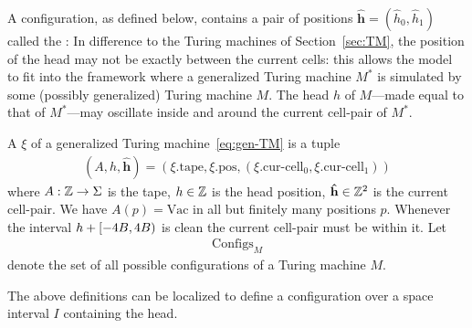 \documentclass[11pt]{memoir}
\theoremstyle{definition} %
\renewcommand{\vek}[1]{\mathbf{#1}}
\def\B{B}
\newcommand{\Configs}{\mathrm{Configs}}
\newcommand{\h}{h} %
\newcommand{\hc}{\hat h}
\newcommand{\vhc}{\vek{\hat h}}
\newcommand{\pos}{\mathrm{pos}}
\newcommand{\curcell}{\textrm{cur-cell}}
\newcommand{\tape}{\mathrm{tape}}
\newcommand{\Vacant}{\mathrm{Vac}}
\begin{document}
A configuration, as defined below, contains a pair of positions
\( \vhc = (\hc_{0},\hc_{1}) \) called the :
In difference to the Turing machines of Section~\ref{sec:TM},
the position of the head may not be exactly between the current cells: this allows the model
to fit into the framework where 
a generalized Turing machine \( M^{*} \) is simulated by some (possibly
generalized) Turing machine \( M \).
The head \( h \) of \( M \)---made equal to that of \( M^{*} \)---may
oscillate inside and around the current cell-pair of \( M^{*} \).

\begin{definition}[Configuration]\label{def:config}
    A  \( \xi \) of a generalized Turing machine~\eqref{eq:gen-TM} is a tuple
    \begin{align*}
      (A,\h,\vhc) = (\xi.\tape,\xi.\pos, (\xi.\curcell_{0},\xi.\curcell_{1}))
    \end{align*}
    where \( A:\mathbb{Z}\to\Sigma \) is the tape, \( \h \in\bbZ \) is the head position, \( \vhc\in\bbZ^{2} \)
    is the current cell-pair.
    We have \( A(p)=\Vacant \) in all but finitely many positions \( p \).
Whenever the interval \( \h+\lint{-4\B}{4\B} \) is clean the current cell-pair
must be within it.
Let
    \begin{align*}
         \Configs_{M}
    \end{align*}
    denote the set of all possible configurations of a Turing machine \( M \).
\end{definition}

The above definitions can be localized to define a configuration 
over a space interval \( I \) containing the head.
\end{document}
